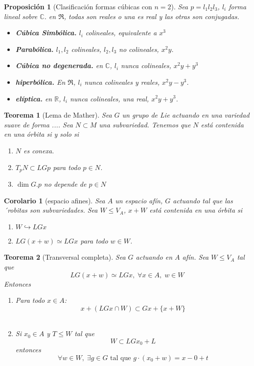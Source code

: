 \documentclass[12pt]{book}
\newtheorem{teo}{Teorema}
\newtheorem{pro}{Proposición}
\newtheorem{cor}{Corolario}
\begin{document}
\begin{pro}[Clasificación formas cúbicas con $n=2$]
Sea $p= l_1 l_2 l_3$, $l_i$ forma lineal sobre $\mathbb{C}$. en $\Re$, todas son reales o una es real y las otras son conjugadas.
\begin{itemize}
\item \textbf{Cúbica Simbólica.} $l_i$ colineales, equivalente a $x^3$
\item \textbf{Parabólica.} $l_1, l_2$ colineales, $l_2,l_3$ no colineales, $x^2 y$.
\item \textbf{Cúbica no degenerada.} en $\mathbb{C}$, $l_i$ nunca colineales, $ x^2 y + y^3  $
\item \textbf{hiperbólica.} En $\Re$, $l_i$ nunca colineales y reales, $x^2 y - y^3$.
\item \textbf{elíptica.} en $\mathbb{R}$, $l_i$ nunca colineales, una real, $ x^2 y + y^3  $.
\end{itemize}
\end{pro}


\begin{teo}[Lema de Mather]
	Sea $G$ un grupo de Lie actuando en una variedad suave de forma .... Sea $N\subset M$ una subvariedad. Tenemos que $N$ está contenida en una órbita si y solo si 
	\begin{enumerate}
		\item $N$ es conexa.
		\item $T_pN \subset LGp$ para todo $p \in N$.
		\item $\dim G.p$ no depende de $p\in N$
	\end{enumerate}
\end{teo}


\begin{cor}[espacio afines]
	Sea $A$ un espacio afín, $G$ actuando tal que las ´robitas son subvariedades. Sea $W \leqslant V_A$, $x+W$ está contenida en una órbita si \begin{enumerate}
		\item $W \hookrightarrow LGx$ 
		\item $LG (x+ w) \simeq LGx$ para todo $w\in W$.
	\end{enumerate}
\end{cor}


\begin{teo}[Transversal completa]
	Sea $G$ actuando en $A$ afín. Sea $W \leqslant V_A$ tal que $$ LG (x+w) \simeq LGx, \; \forall x \in A , \; w \in W $$
	Entonces
	\begin{enumerate}
		\item Para todo $x\in A$: $$ x+ ( LGx \cap W ) \subset Gx + \{ x+ W\} $$\\
		\item Si $x_0 \in A $ y $T \leqslant W$ tal que $$ W \subset LGx_0 +L $$ entonces $$\forall w \in W , \; \exists g \in G \mbox{ tal que }  g \cdot (x_0 + w) = x-0 +t$$  
	\end{enumerate}
	
\end{teo}
\end{document}
